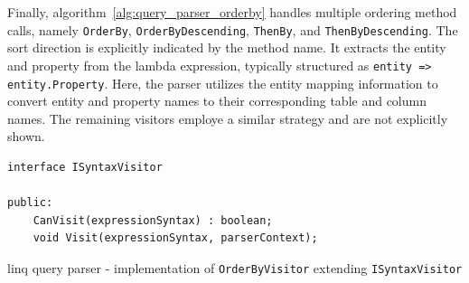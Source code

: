 Finally, algorithm~\ref{alg:query_parser_orderby} handles multiple ordering method calls, namely \texttt{OrderBy}, \texttt{OrderByDescending}, \texttt{ThenBy}, and \texttt{ThenByDescending}. The sort direction is explicitly indicated by the method name. It extracts the entity and property from the lambda expression, typically structured as \texttt{entity => entity.Property}. Here, the parser utilizes the entity mapping information to convert entity and property names to their corresponding table and column names. The remaining visitors employe a similar strategy and are not explicitly shown.

  \begin{lstlisting}[caption={ISyntaxVisitor interface structure}, language=pseudo, label={lst:syntaxvisitor}]
interface ISyntaxVisitor

public:
    CanVisit(expressionSyntax) : boolean;
    void Visit(expressionSyntax, parserContext);
 \end{lstlisting}

\begin{algorithm}[!htp]
    \footnotesize
    \DontPrintSemicolon



    \caption{\acrshort{linq} query parser - implementation of \texttt{OrderByVisitor} extending \texttt{ISyntaxVisitor}}
    \label{alg:query_parser_orderby}
\end{algorithm}
    



